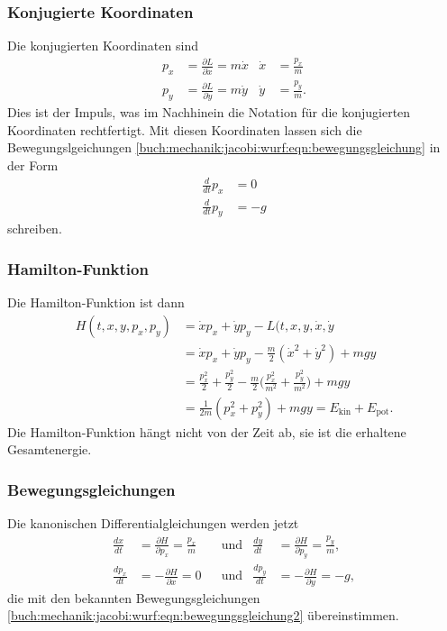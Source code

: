 %
%
\subsubsection{Konjugierte Koordinaten}
Die konjugierten Koordinaten sind
\begin{align*}
p_x &= \frac{\partial L}{\partial \dot{x}} = m\dot{x}
&
\dot{x}
&=
\frac{p_x}{m}
\\
p_y &= \frac{\partial L}{\partial \dot{y}} = m\dot{y}
&
\dot{y}
&=
\frac{p_y}{m}.
\end{align*}
Dies ist der Impuls, was im Nachhinein die Notation für die
konjugierten Koordinaten rechtfertigt.
Mit diesen Koordinaten lassen sich die Bewegungslgeichungen 
\eqref{buch:mechanik:jacobi:wurf:eqn:bewegungsgleichung} in der
Form
\begin{equation}
\begin{aligned}
\frac{d}{dt}p_x &= 0\\
\frac{d}{dt}p_y &= -g
\end{aligned}
\label{buch:mechanik:jacobi:wurf:eqn:bewegungsgleichung2}
\end{equation}
schreiben.

%
%
\subsubsection{Hamilton-Funktion}
Die Hamilton-Funktion ist dann
\begin{align*}
H(t,x,y,p_x,p_y)
&=
\dot{x}p_x
+
\dot{y}p_y
-
L(t,x,y,\dot{x},\dot{y}
\\
&=
\dot{x}p_x
+
\dot{y}p_y
-
\frac{m}2(\dot{x}^2+\dot{y}^2)
+mgy
\\
&=
\frac{p_x^2}{2}
+
\frac{p_y^2}{2}
-
\frac{m}2\biggl(\frac{p_x^2}{m^2} + \frac{p_y^2}{m^2}\biggr) + mgy
\\
&=
\frac{1}{2m}(p_x^2+p_y^2) + mgy
=
E_{\text{kin}} + E_{\text{pot}}.
\end{align*}
Die Hamilton-Funktion hängt nicht von der Zeit ab, sie ist die erhaltene
Gesamtenergie.

%
%
\subsubsection{Bewegungsgleichungen}
Die kanonischen Differentialgleichungen werden jetzt
\begin{align*}
\frac{dx}{dt}
&=
\frac{\partial H}{\partial p_x}
=
\frac{p_x}{m}
&&\text{und}&
\frac{dy}{dt}
&=
\frac{\partial H}{\partial p_y}
=
\frac{p_y}{m},
\\
\frac{dp_x}{dt}
&=
-\frac{\partial H}{\partial x}
=
0
&&\text{und}&
\frac{dp_y}{dt}
&=
-\frac{\partial H}{\partial y}
=
-g,
\end{align*}
die mit den bekannten Bewegungsgleichungen
\eqref{buch:mechanik:jacobi:wurf:eqn:bewegungsgleichung2}
übereinstimmen.

